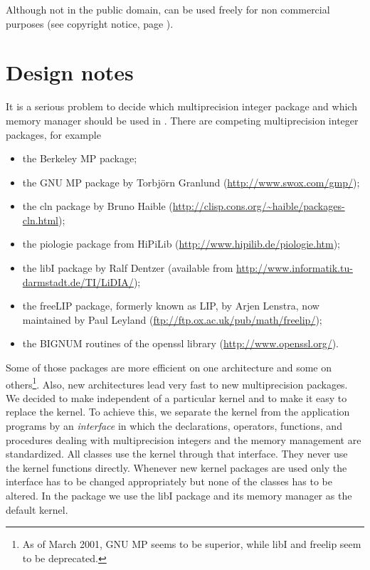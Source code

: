 Although not in the public domain, \LiDIA can be used freely for non commercial purposes (see
copyright notice, page \pageref{chap:copyright}).


\section{Design notes}

It is a serious problem to decide which multiprecision integer package and which memory manager
should be used in \LiDIA.  There are competing multiprecision integer packages, for example
\begin{itemize}
\item the Berkeley MP package;
\item the GNU MP package by Torbj\"orn Granlund (\url{http://www.swox.com/gmp/});
\item the cln package by Bruno Haible (\url{http://clisp.cons.org/~haible/packages-cln.html});
\item the piologie package from HiPiLib (\url{http://www.hipilib.de/piologie.htm});
\item the libI package by Ralf Dentzer (available from
  \url{http://www.informatik.tu-darmstadt.de/TI/LiDIA/});
\item the freeLIP package, formerly known as LIP, by Arjen Lenstra, now maintained by Paul
  Leyland (\url{ftp://ftp.ox.ac.uk/pub/math/freelip/});
\item the BIGNUM routines of the openssl library (\url{http://www.openssl.org/}).
\end{itemize}
Some of those packages are more efficient on one architecture and some on others\footnote{As of
  March 2001, GNU MP seems to be superior, while libI and freelip seem to be deprecated.}.
Also, new architectures lead very fast to new multiprecision packages.  We decided to make
\LiDIA independent of a particular kernel and to make it easy to replace the \LiDIA kernel.  To
achieve this, we separate the kernel from the application programs by an \emph{interface} in
which the declarations, operators, functions, and procedures dealing with multiprecision
integers and the memory management are standardized.  All \LiDIA classes use the kernel through
that interface.  They never use the kernel functions directly.  Whenever new kernel packages are
used only the interface has to be changed appropriately but none of the \LiDIA classes has to be
altered.  In the \LiDIAVersion package we use the libI package and its memory manager as the
default kernel.

